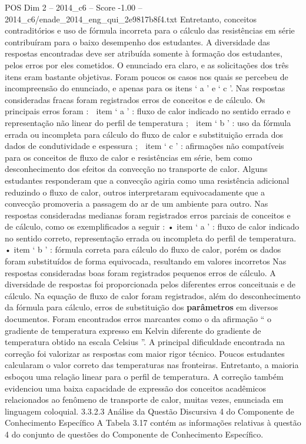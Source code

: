 \begin{textsample}{POS Dim 2 – 2014\_c6 – Score -1.00 – 2014\_c6/enade\_2014\_eng\_qui\_2e9817b8f4.txt}
Entretanto, conceitos contraditórios e uso de fórmula incorreta para o cálculo das resistências em série contribuíram para o baixo desempenho dos estudantes.
A diversidade das respostas encontradas deve ser atribuída somente à formação dos estudantes, pelos erros por eles cometidos.
O enunciado era claro, e as solicitações dos três itens eram bastante objetivas.
Foram poucos os casos nos quais se percebeu de incompreensão do enunciado, e apenas para os itens ‘ a ’ e ‘ c ’.
Nas respostas consideradas fracas foram registrados erros de conceitos e de cálculo.
Os principais erros foram :  item ‘ a ’ : fluxo de calor indicado no sentido errado e representação não linear do perfil de temperatura ;  item ‘ b ’ : uso da fórmula errada ou incompleta para cálculo do fluxo de calor e substituição errada dos dados de condutividade e espessura ;  item ‘ c ’ : afirmações não compatíveis para os conceitos de fluxo de calor e resistências em série, bem como desconhecimento dos efeitos da convecção no transporte de calor.
Alguns estudantes responderam que a convecção agiria como uma resistência adicional reduzindo o fluxo de calor, outros interpretaram equivocadamente que a convecção promoveria a passagem do ar de um ambiente para outro.
Nas respostas consideradas medianas foram registrados erros parciais de conceitos e de cálculo, como os exemplificados a seguir : • item ‘ a ’ : fluxo de calor indicado no sentido correto, representação errada ou incompleta do perfil de temperatura. • item ‘ b ’ : fórmula correta para cálculo do fluxo de calor, porém os dados foram substituídos de forma equivocada, resultando em valores incorretos Nas respostas consideradas boas foram registrados pequenos erros de cálculo.
A diversidade de respostas foi proporcionada pelos diferentes erros conceituais e de cálculo.
Na equação de fluxo de calor foram registrados, além do desconhecimento da fórmula para cálculo, erros de substituição dos \textbf{parâmetros} em diversos documentos.
Foram encontrados erros marcantes como o da afirmação “ o gradiente de temperatura expresso em Kelvin diferente do gradiente de temperatura obtido na escala Celsius ”.
A principal dificuldade encontrada na correção foi valorizar as respostas com maior rigor técnico.
Poucos estudantes calcularam o valor correto das temperaturas nas fronteiras.
Entretanto, a maioria esboçou uma relação linear para o perfil de temperatura.
A correção também evidenciou uma baixa capacidade de expressão dos conceitos acadêmicos relacionados ao fenômeno de transporte de calor, muitas vezes, enunciada em linguagem coloquial. 3.3.2.3 Análise da Questão Discursiva 4 do Componente de Conhecimento Específico A Tabela 3.17 contém as informações relativas à questão 4 do conjunto de questões do Componente de Conhecimento Específico.

\end{textsample}
